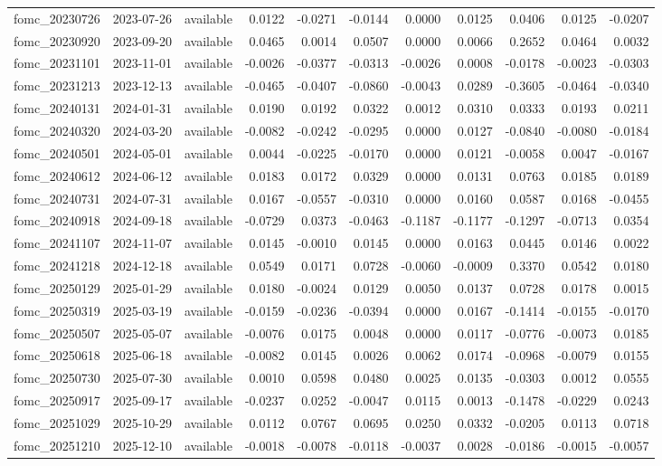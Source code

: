 \begin{tabular}{lllrrrrrrrr}
fomc_20230726 & 2023-07-26 & available & 0.0122 & -0.0271 & -0.0144 & 0.0000 & 0.0125 & 0.0406 & 0.0125 & -0.0207 \\
fomc_20230920 & 2023-09-20 & available & 0.0465 & 0.0014 & 0.0507 & 0.0000 & 0.0066 & 0.2652 & 0.0464 & 0.0032 \\
fomc_20231101 & 2023-11-01 & available & -0.0026 & -0.0377 & -0.0313 & -0.0026 & 0.0008 & -0.0178 & -0.0023 & -0.0303 \\
fomc_20231213 & 2023-12-13 & available & -0.0465 & -0.0407 & -0.0860 & -0.0043 & 0.0289 & -0.3605 & -0.0464 & -0.0340 \\
fomc_20240131 & 2024-01-31 & available & 0.0190 & 0.0192 & 0.0322 & 0.0012 & 0.0310 & 0.0333 & 0.0193 & 0.0211 \\
fomc_20240320 & 2024-03-20 & available & -0.0082 & -0.0242 & -0.0295 & 0.0000 & 0.0127 & -0.0840 & -0.0080 & -0.0184 \\
fomc_20240501 & 2024-05-01 & available & 0.0044 & -0.0225 & -0.0170 & 0.0000 & 0.0121 & -0.0058 & 0.0047 & -0.0167 \\
fomc_20240612 & 2024-06-12 & available & 0.0183 & 0.0172 & 0.0329 & 0.0000 & 0.0131 & 0.0763 & 0.0185 & 0.0189 \\
fomc_20240731 & 2024-07-31 & available & 0.0167 & -0.0557 & -0.0310 & 0.0000 & 0.0160 & 0.0587 & 0.0168 & -0.0455 \\
fomc_20240918 & 2024-09-18 & available & -0.0729 & 0.0373 & -0.0463 & -0.1187 & -0.1177 & -0.1297 & -0.0713 & 0.0354 \\
fomc_20241107 & 2024-11-07 & available & 0.0145 & -0.0010 & 0.0145 & 0.0000 & 0.0163 & 0.0445 & 0.0146 & 0.0022 \\
fomc_20241218 & 2024-12-18 & available & 0.0549 & 0.0171 & 0.0728 & -0.0060 & -0.0009 & 0.3370 & 0.0542 & 0.0180 \\
fomc_20250129 & 2025-01-29 & available & 0.0180 & -0.0024 & 0.0129 & 0.0050 & 0.0137 & 0.0728 & 0.0178 & 0.0015 \\
fomc_20250319 & 2025-03-19 & available & -0.0159 & -0.0236 & -0.0394 & 0.0000 & 0.0167 & -0.1414 & -0.0155 & -0.0170 \\
fomc_20250507 & 2025-05-07 & available & -0.0076 & 0.0175 & 0.0048 & 0.0000 & 0.0117 & -0.0776 & -0.0073 & 0.0185 \\
fomc_20250618 & 2025-06-18 & available & -0.0082 & 0.0145 & 0.0026 & 0.0062 & 0.0174 & -0.0968 & -0.0079 & 0.0155 \\
fomc_20250730 & 2025-07-30 & available & 0.0010 & 0.0598 & 0.0480 & 0.0025 & 0.0135 & -0.0303 & 0.0012 & 0.0555 \\
fomc_20250917 & 2025-09-17 & available & -0.0237 & 0.0252 & -0.0047 & 0.0115 & 0.0013 & -0.1478 & -0.0229 & 0.0243 \\
fomc_20251029 & 2025-10-29 & available & 0.0112 & 0.0767 & 0.0695 & 0.0250 & 0.0332 & -0.0205 & 0.0113 & 0.0718 \\
fomc_20251210 & 2025-12-10 & available & -0.0018 & -0.0078 & -0.0118 & -0.0037 & 0.0028 & -0.0186 & -0.0015 & -0.0057 \\
\bottomrule
\end{tabular}

